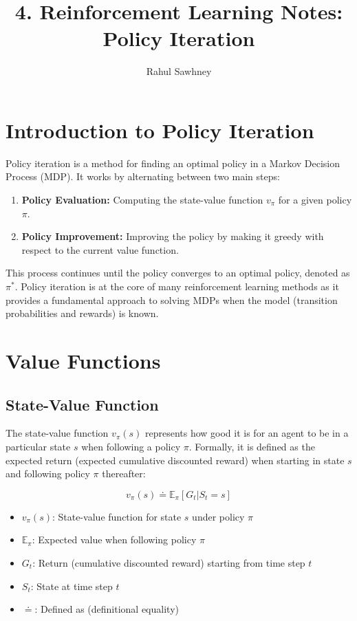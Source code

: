 \documentclass{article}
\title{4. Reinforcement Learning Notes: Policy Iteration}
\author{Rahul Sawhney}
\begin{document}
\maketitle

\tableofcontents
\newpage

\section{Introduction to Policy Iteration}

Policy iteration is a method for finding an optimal policy in a Markov Decision Process (MDP). It works by alternating between two main steps:
\begin{enumerate}
    \item \textbf{Policy Evaluation:} Computing the state-value function $v_\pi$ for a given policy $\pi$.
    \item \textbf{Policy Improvement:} Improving the policy by making it greedy with respect to the current value function.
\end{enumerate}

This process continues until the policy converges to an optimal policy, denoted as $\pi^*$. Policy iteration is at the core of many reinforcement learning methods as it provides a fundamental approach to solving MDPs when the model (transition probabilities and rewards) is known.

\section{Value Functions}

\subsection{State-Value Function}

The state-value function $v_\pi(s)$ represents how good it is for an agent to be in a particular state $s$ when following a policy $\pi$. Formally, it is defined as the expected return (expected cumulative discounted reward) when starting in state $s$ and following policy $\pi$ thereafter:

\begin{equation}
v_\pi(s) \doteq \mathbb{E}_\pi[G_t|S_t = s]
\end{equation}

\begin{tcolorbox}[colframe=blue!50!black, colback=blue!10, title=Notation Overview]
\begin{itemize}
    \item $v_\pi(s)$: State-value function for state $s$ under policy $\pi$
    \item $\mathbb{E}_\pi$: Expected value when following policy $\pi$
    \item $G_t$: Return (cumulative discounted reward) starting from time step $t$
    \item $S_t$: State at time step $t$
    \item $\doteq$: Defined as (definitional equality)
\end{itemize}
\end{tcolorbox}
\end{document}

